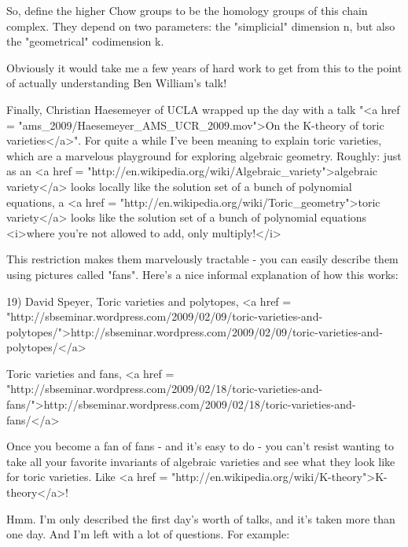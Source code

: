 So, define the higher Chow groups to be the homology groups of this
chain complex.  They depend on two parameters: the
"simplicial" dimension n, but also the
"geometrical" codimension k.

Obviously it would take me a few years of hard work to get from
this to the point of actually understanding Ben William's talk!  

Finally, Christian Haesemeyer of UCLA wrapped up the day with a talk
"<a href = "ams_2009/Haesemeyer_AMS_UCR_2009.mov">On the K-theory
of toric varieties</a>".  For quite a while I've been meaning to
explain toric varieties, which are a marvelous playground for
exploring algebraic geometry.  Roughly: just as an <a href =
"http://en.wikipedia.org/wiki/Algebraic_variety">algebraic variety</a>
looks locally like the solution set of a bunch of polynomial
equations, a <a href =
"http://en.wikipedia.org/wiki/Toric_geometry">toric variety</a> looks
like the solution set of a bunch of polynomial equations <i>where
you're not allowed to add, only multiply!</i>

This restriction makes them marvelously tractable - you can easily
describe them using pictures called "fans".  Here's a nice 
informal explanation of how this works:

19) David Speyer, Toric varieties and polytopes, 
<a href = "http://sbseminar.wordpress.com/2009/02/09/toric-varieties-and-polytopes/">http://sbseminar.wordpress.com/2009/02/09/toric-varieties-and-polytopes/</a>

Toric varieties and fans, 
<a href = "http://sbseminar.wordpress.com/2009/02/18/toric-varieties-and-fans/">http://sbseminar.wordpress.com/2009/02/18/toric-varieties-and-fans/</a>

Once you become a fan of fans - and it's easy to do - you can't
resist wanting to take all your favorite invariants of algebraic
varieties and see what they look like for toric varieties.  Like
<a href = "http://en.wikipedia.org/wiki/K-theory">K-theory</a>!

Hmm.  I'm only described the first day's worth of talks, and it's
taken more than one day.  And I'm left with a lot of questions.
For example:


